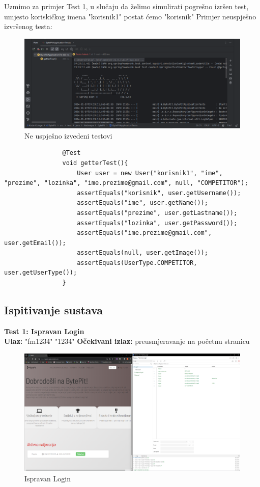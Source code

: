 			Uzmimo za primjer Test 1, u slučaju da želimo simulirati pogrešno izršen test, umjesto koriskičkog imena "korisnik1" postat ćemo "korisnik"
			Primjer neuspješno izvršenog testa:
			\begin{figure}[H]
				\includegraphics[scale=0.6]{slike/test2}
				\centering
				\caption{Ne uspješno izvedeni testovi}
				\label{fig:neuspjeh}
			\end{figure}
			
			\begin{lstlisting}
				@Test
				void getterTest(){
					User user = new User("korisnik1", "ime", "prezime", "lozinka", "ime.prezime@gmail.com", null, "COMPETITOR");
					assertEquals("korisnik", user.getUsername());
					assertEquals("ime", user.getName());
					assertEquals("prezime", user.getLastname());
					assertEquals("lozinka", user.getPassword());
					assertEquals("ime.prezime@gmail.com", user.getEmail());
					assertEquals(null, user.getImage());
					assertEquals(UserType.COMPETITOR, user.getUserType());	
				}
			\end{lstlisting}
			
		\subsection{Ispitivanje sustava}			
			 			
			 \textbf{Test 1: Ispravan Login}\\
			 \textbf{Ulaz:} "fm1234" "1234" 
			 \textbf{Očekivani izlaz:} preusmjeravanje na početnu stranicu 
			 
			 \begin{figure}[H]
			 	\includegraphics[scale=0.2]{slike/ispitTest1}
			 	\centering
			 	\caption{Ispravan Login}
			 	\label{fig:ispitest1}
			 \end{figure}
			 
